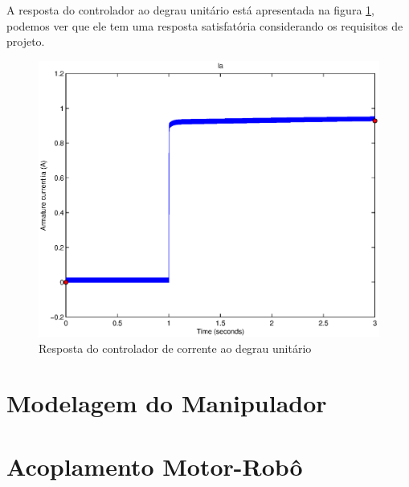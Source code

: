 \documentclass{article}
\begin{document}
A resposta do controlador ao degrau unitário está apresentada na figura \ref{fig:ia2}, podemos ver que ele tem uma resposta satisfatória considerando os requisitos de projeto.
\begin{figure}[H]
	\centering
	\includegraphics[width=0.7\linewidth]{matlab/ia2}
	\caption{Resposta do controlador de corrente ao degrau unitário}
	\label{fig:ia2}
\end{figure}

\section{Modelagem do Manipulador}
\section{Acoplamento Motor-Robô}



\end{document}
